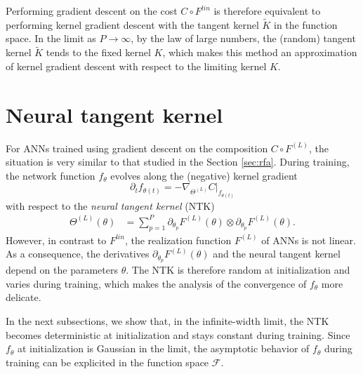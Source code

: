 \documentclass{article}
\begin{document}
Performing gradient descent on the cost $ C \circ F^{lin}$ is therefore equivalent to performing kernel gradient descent with the tangent kernel $\tilde{K}$ in the function space. In the limit as $P \to \infty$, by the law of large numbers, the (random) tangent kernel $\tilde{K}$ tends to the fixed kernel $K$, which makes this method an approximation of kernel gradient descent with respect to the limiting kernel $K$.

\section{Neural tangent kernel} \label{sec:neural_tangent_kernel}
For ANNs trained using gradient descent on the composition $C \circ F^{(L)}$, the situation is very similar to that studied in the Section \ref{sec:rfa}. During training, the network function $f_\theta$ evolves along the (negative) kernel gradient
$$
\partial_t  f_{\theta(t)} = -\nabla_{\Theta^{(L)}} C|_{f_{\theta(t)}}
$$
with respect to the \emph{neural tangent kernel} (NTK)
\begin{align*}
 \Theta^{(L)}(\theta) &= \sum_{p=1}^P \partial_{\theta_p} F^{(L)}(\theta) \otimes \partial_{\theta_p} F^{(L)}(\theta).
\end{align*}
However, in contrast to $F^{lin}$, the realization function $F^{(L)}$ of ANNs is not linear. As a consequence, the derivatives $\partial_{\theta_p} F^{(L)}(\theta)$ and the neural tangent kernel depend on the parameters $\theta$. The NTK is therefore random at initialization and varies during training, which makes the analysis of the convergence of $f_\theta$ more delicate.

In the next subsections, we show that, in the infinite-width limit, the NTK becomes deterministic at initialization and stays constant during training. Since $f_\theta$ at initialization is Gaussian in the limit, the asymptotic behavior of $f_\theta$ during training can be explicited in the function space $ \mathcal{F} $.
\end{document}
